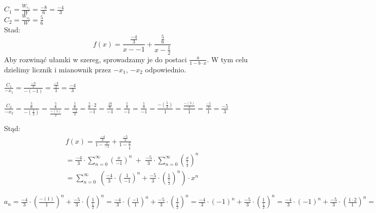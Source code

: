 \documentclass[12pt]{article}
\begin{document}
 $ C_1 =   \frac{W_{c_1}}{W }  =\frac{ {-8} }{ {6} }  = \frac{ {-4} }{ {3} } $\\ $  C_2 =   \frac{W_{c_2}}{W}  =  \frac{ {5} }{ {6} } $\\Stad:
$$f(x)=\frac{\frac{ {-4} }{ {3} } }{x - {-1}}+\frac{\frac{ {5} }{ {6} } }{x - \frac{ {1} }{ {2} } }$$
 Aby rozwinąć ułamki w szereg, sprowadzamy je do postaci $\frac{a}{1-b\cdot x}$.
 W tym celu dzielimy licznik i mianownik przez $-x_1$, $-x_2$ odpowiednio.

$\frac{C_1}{-x_1}=\frac{ \frac{ {-4} }{ {3} }  }{ - ( {-1} )  }  = \frac{ \frac{ {-4} }{ {3} }  }{ {1} }  = \frac{ {-4} }{ {3} } $

$\frac{C_2}{-x_2}=\frac{ \frac{ {5} }{ {6} }  }{ - ( \frac{ {1} }{ {2} }  )  }  = \frac{ \frac{ {5} }{ {6} }  }{ \frac{ - ( {1} )  }{ {2} }  }  = \frac{ \frac{ {5} }{ {6} }  }{ \frac{ {-1} }{ {2} }  }  = \frac{ \frac{ {5} }{ {6} } \cdot{2} }{ {-1} }  = \frac{ \frac{ {10} }{ {6} }  }{ {-1} }  = \frac{ \frac{ {5} }{ {3} }  }{ {-1} }  = \frac{ \frac{ {5} }{ {3} }  }{ {-1} }  = \frac{ - ( \frac{ {5} }{ {3} }  )  }{ {1} }  = \frac{ \frac{ - ( {5} )  }{ {3} }  }{ {1} }  = \frac{ \frac{ {-5} }{ {3} }  }{ {1} }  = \frac{ {-5} }{ {3} } $

Stąd:
\begin{multline}f(x)=\frac{\frac{ {-4} }{ {3} } }{1-\frac{x}{{-1}}}+\frac{\frac{ {-5} }{ {3} } }{1-\frac{x}{ \frac{ {1} }{ {2} } }}\\ = \frac{ {-4} }{ {3} } \cdot \sum_{n=0}^\infty\left(\frac{x}{{-1}}\right)^n\;+\;\frac{ {-5} }{ {3} } \cdot \sum_{n=0}^\infty\left(\frac{x}{\frac{ {1} }{ {2} } }\right)^n\\=\sum_{n=0}^\infty\;\left(\frac{ {-4} }{ {3} } \cdot \left(\frac{1}{{-1}}\right)^n+\frac{ {-5} }{ {3} } \cdot \left(\frac{1}{\frac{ {1} }{ {2} } }\right)^n\right)\cdot x^n\end{multline}

$a_n = \frac{ {-4} }{ {3} } \cdot\left(\frac{ - ( {1} )  }{ {1} } \right)^ {{n}} + \frac{ {-5} }{ {3} } \cdot\left(\frac{ {1} }{ \frac{ {1} }{ {2} }  } \right)^ {{n}} = \frac{ {-4} }{ {3} } \cdot\left(\frac{ {-1} }{ {1} } \right)^ {{n}} + \frac{ {-5} }{ {3} } \cdot\left(\frac{ {1} }{ \frac{ {1} }{ {2} }  } \right)^ {{n}} = \frac{ {-4} }{ {3} } \cdot\left({-1}\right)^ {{n}} + \frac{ {-5} }{ {3} } \cdot\left(\frac{ {1} }{ \frac{ {1} }{ {2} }  } \right)^ {{n}} = \frac{ {-4} }{ {3} } \cdot\left({-1}\right)^ {{n}} + \frac{ {-5} }{ {3} } \cdot\left(\frac{ {1}\cdot{2} }{ {1} } \right)^ {{n}} = \frac{ {-4} }{ {3} } \cdot\left({-1}\right)^ {{n}} + \frac{ {-5} }{ {3} } \cdot\left(\frac{ {2} }{ {1} } \right)^ {{n}} = \frac{ {-4} }{ {3} } \cdot\left({-1}\right)^ {{n}} + \frac{ {-5} }{ {3} } \cdot{2}^ {{n}}$
\end{document}
